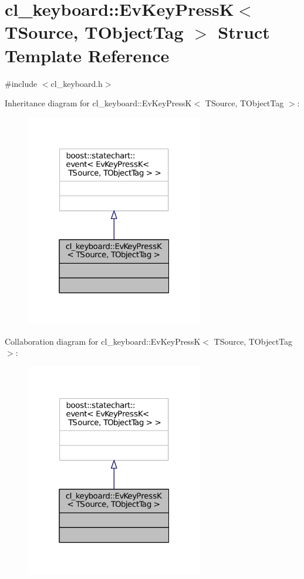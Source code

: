 \hypertarget{structcl__keyboard_1_1EvKeyPressK}{}\section{cl\+\_\+keyboard\+:\+:Ev\+Key\+PressK$<$ T\+Source, T\+Object\+Tag $>$ Struct Template Reference}
\label{structcl__keyboard_1_1EvKeyPressK}


{\ttfamily \#include $<$cl\+\_\+keyboard.\+h$>$}



Inheritance diagram for cl\+\_\+keyboard\+:\+:Ev\+Key\+PressK$<$ T\+Source, T\+Object\+Tag $>$\+:
\nopagebreak
\begin{figure}[H]
\begin{center}
\leavevmode
\includegraphics[width=220pt]{structcl__keyboard_1_1EvKeyPressK__inherit__graph}
\end{center}
\end{figure}


Collaboration diagram for cl\+\_\+keyboard\+:\+:Ev\+Key\+PressK$<$ T\+Source, T\+Object\+Tag $>$\+:
\nopagebreak
\begin{figure}[H]
\begin{center}
\leavevmode
\includegraphics[width=220pt]{structcl__keyboard_1_1EvKeyPressK__coll__graph}
\end{center}
\end{figure}


